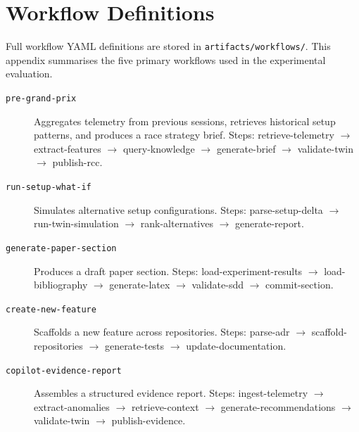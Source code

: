 \section{Workflow Definitions}
\label{app:workflow-definitions}

Full workflow YAML definitions are stored in
\texttt{artifacts/workflows/}. This appendix summarises the five primary
workflows used in the experimental evaluation.

\begin{description}
  \item[\texttt{pre-grand-prix}] Aggregates telemetry from previous sessions,
    retrieves historical setup patterns, and produces a race strategy brief.
    Steps: retrieve-telemetry $\to$ extract-features $\to$ query-knowledge $\to$
    generate-brief $\to$ validate-twin $\to$ publish-rcc.

  \item[\texttt{run-setup-what-if}] Simulates alternative setup configurations.
    Steps: parse-setup-delta $\to$ run-twin-simulation $\to$ rank-alternatives
    $\to$ generate-report.

  \item[\texttt{generate-paper-section}] Produces a draft paper section.
    Steps: load-experiment-results $\to$ load-bibliography $\to$
    generate-latex $\to$ validate-sdd $\to$ commit-section.

  \item[\texttt{create-new-feature}] Scaffolds a new feature across repositories.
    Steps: parse-adr $\to$ scaffold-repositories $\to$ generate-tests $\to$
    update-documentation.

  \item[\texttt{copilot-evidence-report}] Assembles a structured evidence report.
    Steps: ingest-telemetry $\to$ extract-anomalies $\to$ retrieve-context $\to$
    generate-recommendations $\to$ validate-twin $\to$ publish-evidence.
\end{description}
